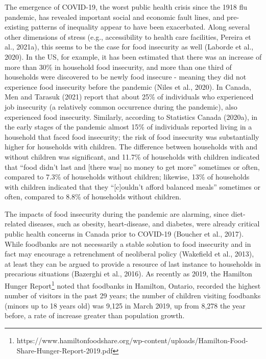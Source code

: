 \documentclass[]{elsarticle} %
\begin{document}
The emergence of COVID-19, the worst public health crisis since the 1918
flu pandemic, has revealed important social and economic fault lines,
and pre-existing patterns of inequality appear to have been exacerbated.
Along several other dimensions of stress (e.g., accessibility to health
care facilities, Pereira et al., 2021a), this seems to be the case for
food insecurity as well (Laborde et al., 2020). In the US, for example,
it has been estimated that there was an increase of more than 30\% in
household food insecurity, and more than one third of households were
discovered to be newly food insecure - meaning they did not experience
food insecurity before the pandemic (Niles et al., 2020). In Canada, Men
and Tarasuk (2021) report that about 25\% of individuals who experienced
job insecurity (a relatively common occurrence during the pandemic),
also experienced food insecurity. Similarly, according to Statistics
Canada (2020a), in the early stages of the pandemic almost 15\% of
individuals reported living in a household that faced food insecurity;
the risk of food insecurity was substantially higher for households with
children. The difference between households with and without children
was significant, and 11.7\% of households with children indicated that
``food didn't last and {[}there was{]} no money to get more'' sometimes
or often, compared to 7.3\% of households without children; likewise,
13\% of households with children indicated that they ``{[}c{]}ouldn't
afford balanced meals'' sometimes or often, compared to 8.8\% of
households without children.

The impacts of food insecurity during the pandemic are alarming, since
diet-related diseases, such as obesity, heart-disease, and diabetes,
were already critical public health concerns in Canada prior to COVID-19
(Boucher et al., 2017). While foodbanks are not necessarily a stable
solution to food insecurity and in fact may encourage a retrenchment of
neoliberal policy (Wakefield et al., 2013), at least they can be argued
to provide a resource of last instance to households in precarious
situations (Bazerghi et al., 2016). As recently as 2019, the Hamilton
Hunger Report\footnote{https://www.hamiltonfoodshare.org/wp-content/uploads/Hamilton-Food-Share-Hunger-Report-2019.pdf}
noted that foodbanks in Hamilton, Ontario, recorded the highest number
of visitors in the past 29 years; the number of children visiting
foodbanks (minors up to 18 years old) was 9,125 in March 2019, up from
8,278 the year before, a rate of increase greater than population
growth.
\end{document}
